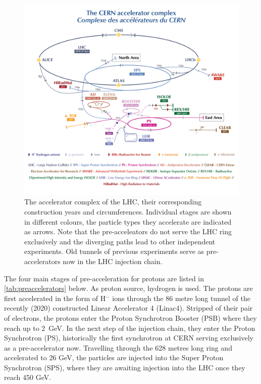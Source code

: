 \begin{figure}[h!]
	\centering
	\includegraphics[width=\textwidth]{figures/theoryexperiment/CCC-v2019-final-white}
	\caption{The accelerator complex of the LHC, their corresponding construction years and circumferences. Individual stages are shown in different colours, the particle types they accelerate are indicated as arrows. Note that the pre-acceleators do not serve the LHC ring exclusively and the diverging paths lead to other independent experiments. Old tunnels of previous experiments serve as pre-accelerators now in the LHC injection chain. \cite{Mobs:2684277}}
	\label{fig:lhcstructure}
\end{figure}

The four main stages of pre-acceleration for protons are listed in \ref{tab:preaccelerators} below. As proton source, hydrogen is used. The protons are first accelerated in the form of H$^-$ ions through the 86 metre long tunnel of the recently (2020) constructed Linear Accelerator 4 (Linac4). Stripped of their pair of electrons, the protons enter the Proton Synchrotron Booster (PSB) where they reach up to \SI{2}{\giga\electronvolt}. In the next step of the injection chain, they enter the Proton Synchrotron (PS), historically the first synchrotron at CERN serving exclusively as a pre-accelerator now. Travelling through the 628 metres long ring and accelerated to 26 GeV, the particles are injected into the Super Proton Synchrotron (SPS), where they are awaiting injection into the LHC once they reach 450 GeV.

